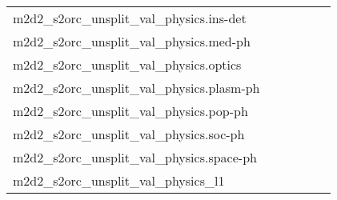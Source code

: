 {\begin{longtable}{m{6cm}m{1.7cm}m{1.7cm}m{1.7cm}m{1.7cm}m{1.7cm}}
	m2d2\_s2orc\_unsplit\_val\_physics.ins-det  & \colorbox[HTML]{c6e89a}{\makebox[\mywidth][c]{14.01}} & \colorbox[HTML]{e2f3a9}{\makebox[\mywidth][c]{14.16}} & \colorbox[HTML]{ffffe5}{\makebox[\mywidth][c]{16.14}} & \colorbox[HTML]{d4eea0}{\makebox[\mywidth][c]{14.07}} & \colorbox[HTML]{77c578}{\makebox[\mywidth][c]{13.79}}\\
	m2d2\_s2orc\_unsplit\_val\_physics.med-ph  & \colorbox[HTML]{cae99c}{\makebox[\mywidth][c]{14.34}} & \colorbox[HTML]{e1f3a9}{\makebox[\mywidth][c]{14.46}} & \colorbox[HTML]{ffffe5}{\makebox[\mywidth][c]{16.50}} & \colorbox[HTML]{bfe596}{\makebox[\mywidth][c]{14.29}} & \colorbox[HTML]{77c578}{\makebox[\mywidth][c]{14.09}}\\
	m2d2\_s2orc\_unsplit\_val\_physics.optics  & \colorbox[HTML]{c5e799}{\makebox[\mywidth][c]{12.74}} & \colorbox[HTML]{ebf7b0}{\makebox[\mywidth][c]{12.94}} & \colorbox[HTML]{ffffe5}{\makebox[\mywidth][c]{14.64}} & \colorbox[HTML]{d5eea1}{\makebox[\mywidth][c]{12.80}} & \colorbox[HTML]{77c578}{\makebox[\mywidth][c]{12.54}}\\
	m2d2\_s2orc\_unsplit\_val\_physics.plasm-ph  & \colorbox[HTML]{c3e698}{\makebox[\mywidth][c]{13.65}} & \colorbox[HTML]{e2f3a9}{\makebox[\mywidth][c]{13.81}} & \colorbox[HTML]{ffffe5}{\makebox[\mywidth][c]{15.77}} & \colorbox[HTML]{ceeb9e}{\makebox[\mywidth][c]{13.69}} & \colorbox[HTML]{77c578}{\makebox[\mywidth][c]{13.44}}\\
	m2d2\_s2orc\_unsplit\_val\_physics.pop-ph  & \colorbox[HTML]{f2fab5}{\makebox[\mywidth][c]{13.80}} & \colorbox[HTML]{dff2a7}{\makebox[\mywidth][c]{13.67}} & \colorbox[HTML]{ffffe5}{\makebox[\mywidth][c]{15.17}} & \colorbox[HTML]{cdeb9d}{\makebox[\mywidth][c]{13.60}} & \colorbox[HTML]{77c578}{\makebox[\mywidth][c]{13.41}}\\
	m2d2\_s2orc\_unsplit\_val\_physics.soc-ph  & \colorbox[HTML]{b2df90}{\makebox[\mywidth][c]{12.79}} & \colorbox[HTML]{def2a6}{\makebox[\mywidth][c]{12.97}} & \colorbox[HTML]{ffffe5}{\makebox[\mywidth][c]{14.80}} & \colorbox[HTML]{bde395}{\makebox[\mywidth][c]{12.83}} & \colorbox[HTML]{77c578}{\makebox[\mywidth][c]{12.66}}\\
	m2d2\_s2orc\_unsplit\_val\_physics.space-ph  & \colorbox[HTML]{d5eea1}{\makebox[\mywidth][c]{13.00}} & \colorbox[HTML]{e4f4ab}{\makebox[\mywidth][c]{13.09}} & \colorbox[HTML]{ffffe5}{\makebox[\mywidth][c]{14.77}} & \colorbox[HTML]{c2e698}{\makebox[\mywidth][c]{12.94}} & \colorbox[HTML]{77c578}{\makebox[\mywidth][c]{12.76}}\\
	m2d2\_s2orc\_unsplit\_val\_physics\_l1  & \colorbox[HTML]{f2fab5}{\makebox[\mywidth][c]{15.57}} & \colorbox[HTML]{dcf1a5}{\makebox[\mywidth][c]{15.43}} & \colorbox[HTML]{ffffe5}{\makebox[\mywidth][c]{16.97}} & \colorbox[HTML]{d5eea1}{\makebox[\mywidth][c]{15.40}} & \colorbox[HTML]{77c578}{\makebox[\mywidth][c]{15.18}}\\

\end{longtable}}
